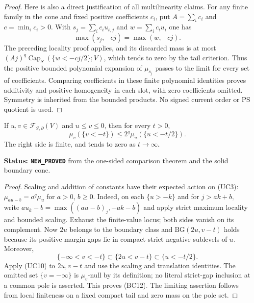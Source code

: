 \begin{proof}
Here is also a direct justification of all multilinearity claims.
For any finite family in the cone and fixed positive coefficients
$c_i$, put $A=\sum_i c_i$ and $c=\min_i c_i>0$. With
$s_j=\sum_i c_i u_{i,j}$ and $w=\sum_i c_i u_i$ one has
\[
                    \max(s_j,-cj)=\max(w,-cj).
\]
The preceding locality proof applies, and its discarded mass is
at most $(Aj)^q\operatorname{Cap}_S(\{w<-cj/2\};V)$, which
tends to zero by the tail criterion. Thus the positive bounded
polynomial expansion of $\mu_{s_j}$ passes to the limit for
every set of coefficients. Comparing coefficients in these finite
polynomial identities proves additivity and positive homogeneity
in each slot, with zero coefficients omitted. Symmetry is inherited
from the bounded products. No signed current order or PS quotient
is used.
\end{proof}

\begin{lemma}
\label{lem:r11-uniform-upper-tail}
If $u,v\in\mathcal F_{S,\partial}(V)$ and $u\leq v\leq0$,
then for every $t>0$,
\[
                 \mu_v(\{v<-t\})
                      \leq2^q\mu_u(\{u<-t/2\}).
 \tag{BC12}
\]
The right side is finite, and tends to zero as $t\to\infty$.
\end{lemma}

\noindent\textbf{Status: \texttt{NEW\_PROVED}} from the
one-sided comparison theorem and the solid boundary cone.

\begin{proof}
Scaling and addition of constants have their expected action on
(UC3): $\mu_{au-b}=a^q\mu_u$ for $a>0$, $b\geq0$.
Indeed, on each $\{u>-k\}$ and for $j>ak+b$, write
$au_k-b=\max((au-b)_j,-ak-b)$ and apply strict maximum
locality and bounded scaling. Exhaust the finite-value locus;
both sides vanish on its complement.
Now $2u$ belongs to the boundary class and
$\mathrm{BG}(2u,v-t)$ holds because its positive-margin gaps lie
in compact strict negative sublevels of $u$. Moreover,
\[
       \{-\infty<v<-t\}\subset\{2u<v-t\}
                                      \subset\{u<-t/2\}.
\]
Apply (UC10) to $2u,v-t$ and use the scaling and translation
identities. The omitted set $\{v=-\infty\}$ is $\mu_v$-null
by its definition; no literal strict-gap inclusion at a common
pole is asserted. This proves (BC12). The limiting assertion follows
from local finiteness on a fixed compact tail and zero mass on
the pole set.
\end{proof}

